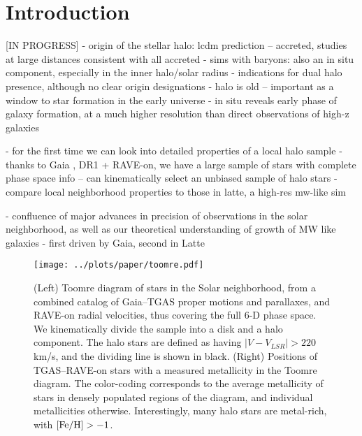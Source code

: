 \documentclass[apj, twocolappendix, numberedappendix, appendixfloats]{emulateapj}
\begin{document}
\section{Introduction}
[IN PROGRESS]
- origin of the stellar halo: lcdm prediction -- accreted, studies at large distances consistent with all accreted
- sims with baryons: also an in situ component, especially in the inner halo/solar radius
- indications for dual halo presence, although no clear origin designations
- halo is old -- important as a window to star formation in the early universe
- in situ reveals early phase of galaxy formation, at a much higher resolution than direct observations of high-z galaxies

- for the first time we can look into detailed properties of a local halo sample
- thanks to Gaia \citep{perryman2001}, DR1 + RAVE-on, we have a large sample of stars with complete phase space info -- can kinematically select an unbiased sample of halo stars
- compare local neighborhood properties to those in latte, a high-res mw-like sim

- confluence of major advances in precision of observations in the solar neighborhood, as well as our theoretical understanding of growth of MW like galaxies
- first driven by Gaia, second in Latte


\begin{figure*}
\begin{center}
\texttt{[image: ../plots/paper/toomre.pdf]}
\caption{(Left) Toomre diagram of stars in the Solar neighborhood, from a combined catalog of Gaia--TGAS proper motions and parallaxes, and RAVE-on radial velocities, thus covering the full 6-D phase space.
We kinematically divide the sample into a disk and a halo component.
The halo stars are defined as having $|V-V_{LSR}|>220$\,km/s, and the dividing line is shown in black.
(Right) Positions of TGAS--RAVE-on stars with a measured metallicity in the Toomre diagram.
The color-coding corresponds to the average metallicity of stars in densely populated regions of the diagram, and individual metallicities otherwise.
Interestingly, many halo stars are metal-rich, with $\rm[Fe/H]>-1$.}
\label{fig:toomre}
\end{center}
\end{figure*}
\end{document}
